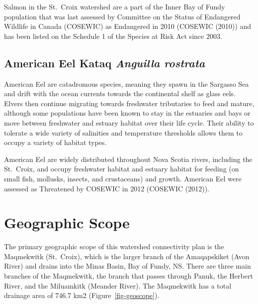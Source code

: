 \documentclass[
  letterpaper,
  DIV=11,
  numbers=noendperiod]{scrreprt}
\begin{document}
Salmon in the St.~Croix watershed are a part of the Inner Bay of Fundy
population that was last assessed by Committee on the Status of
Endangered Wildlife in Canada (COSEWIC) as Endangered in 2010 (COSEWIC
(2010)) and has been listed on the Schedule 1 of the Species at Risk Act
since 2003.

\subsection*{\texorpdfstring{American Eel \textbar{} Kataq \textbar{}
\emph{Anguilla
rostrata}}{American Eel \textbar{} Kataq \textbar{} Anguilla rostrata}}\label{american-eel-kataq-anguilla-rostrata}

American Eel are catadromous species, meaning they spawn in the Sargasso
Sea and drift with the ocean currents towards the continental shelf as
glass eels. Elvers then continue migrating towards freshwater
tributaries to feed and mature, although some populations have been
known to stay in the estuaries and bays or move between freshwater and
estuary habitat over their life cycle. Their ability to tolerate a wide
variety of salinities and temperature thresholds allows them to occupy a
variety of habitat types.

American Eel are widely distributed throughout Nova Scotia rivers,
including the St.~Croix, and occupy freshwater habitat and estuary
habitat for feeding (on small fish, mollusks, insects, and crustaceans)
and growth. American Eel were assessed as Threatened by COSEWIC in 2012
(COSEWIC (2012)).

\section*{Geographic Scope}\label{geographic-scope}


The primary geographic scope of this watershed connectivity plan is the
Maqmekwitk (St.~Croix), which is the larger branch of the Amaqapskiket
(Avon River) and drains into the Minas Basin, Bay of Fundy, NS. There
are three main branches of the Maqmekwitk, the branch that passes
through Panuk, the Herbert River, and the Miluamkitk (Meander River).
The Maqmekwitk has a total drainage area of 746.7 km2
(Figure~\ref{fig-geoscope}).
\end{document}
